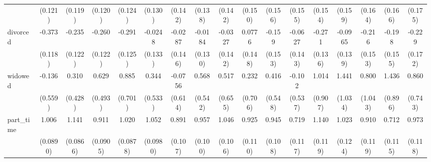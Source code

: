 {\begin{tabular}{l*{16}{c}}
                    &     (0.121)         &     (0.119)         &     (0.120)         &     (0.124)         &     (0.130)         &     (0.142)         &     (0.138)         &     (0.142)         &     (0.150)         &     (0.156)         &     (0.155)         &     (0.154)         &     (0.159)         &     (0.164)         &     (0.166)         &     (0.175)         \\
[1em]
divorced            &      -0.373\sym{**} &      -0.235         &      -0.260\sym{*}  &      -0.291\sym{*}  &     -0.0248         &     -0.0287         &     -0.0184         &     -0.0327         &      0.0776         &      -0.159         &     -0.0627         &      -0.271\sym{*}  &     -0.0965         &      -0.216         &      -0.198         &      -0.229         \\
                    &     (0.118)         &     (0.122)         &     (0.122)         &     (0.125)         &     (0.133)         &     (0.146)         &     (0.130)         &     (0.142)         &     (0.148)         &     (0.153)         &     (0.143)         &     (0.136)         &     (0.139)         &     (0.153)         &     (0.155)         &     (0.172)         \\
[1em]
widowed             &      -0.136         &       0.310         &       0.629         &       0.885         &       0.344         &     -0.0756         &       0.568         &       0.517         &       0.232         &       0.416         &      -0.102         &       1.014         &       1.441         &       0.800         &       1.436         &       0.860         \\
                    &     (0.559)         &     (0.428)         &     (0.493)         &     (0.701)         &     (0.533)         &     (0.614)         &     (0.542)         &     (0.655)         &     (0.706)         &     (0.548)         &     (0.537)         &     (0.907)         &     (1.034)         &     (1.043)         &     (0.896)         &     (0.743)         \\
[1em]
part\_time           &       1.006\sym{***}&       1.141\sym{***}&       0.911\sym{***}&       1.020\sym{***}&       1.052\sym{***}&       0.891\sym{***}&       0.957\sym{***}&       1.046\sym{***}&       0.925\sym{***}&       0.945\sym{***}&       0.719\sym{***}&       1.140\sym{***}&       1.023\sym{***}&       0.910\sym{***}&       0.712\sym{***}&       0.973\sym{***}\\
                    &    (0.0890)         &    (0.0866)         &    (0.0905)         &    (0.0878)         &    (0.0980)         &     (0.107)         &     (0.100)         &     (0.106)         &     (0.110)         &     (0.108)         &     (0.117)         &     (0.119)         &     (0.124)         &     (0.119)         &     (0.115)         &     (0.118)         \\

\end{tabular}}
